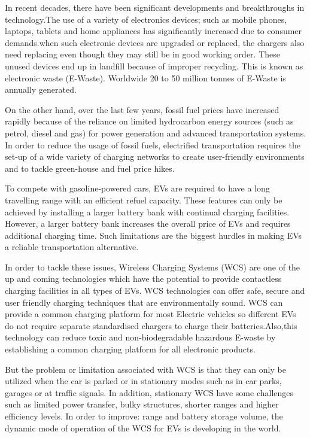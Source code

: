 In recent decades, there have been significant developments and breakthroughs in technology.The use of a variety of  electronics devices; such as mobile
phones, laptops, tablets and home appliances has significantly increased due to
consumer demands.when such electronic devices are upgraded or replaced, the
chargers also need replacing even though they may still be in good working order. 
These unused devices end up in landfill because of improper recycling. This
is known as electronic waste (E-Waste). Worldwide 20 to 50 million tonnes of
E-Waste is annually generated.

On the other hand, over the last few years, fossil fuel prices have increased rapidly because of the reliance
on limited hydrocarbon energy sources (such as petrol, diesel and gas) for power
generation and advanced transportation systems. In order to reduce the usage of fossil
fuels, electrified transportation requires the set-up of a wide variety of charging networks
to create user-friendly environments and to tackle green-house and fuel price hikes.

To compete with gasoline-powered cars, EVs are required to have a long travelling range with an efficient refuel
capacity. These features can only be achieved by installing a larger battery bank with
continual charging facilities. However, a larger battery bank increases the overall price
of EVs and requires additional charging time. Such limitations are the biggest hurdles in
making EVs a reliable transportation alternative.

In order to tackle these issues, Wireless Charging Systems (WCS) are one of the up and
coming technologies which have the potential to provide contactless charging facilities in all types of EVs.
WCS technologies  can offer safe, secure and user friendly charging
techniques that are environmentally sound. WCS can provide a common charging
platform for most Electric vehicles so different EVs do not require
separate standardised chargers to charge their batteries.Also,this technology can reduce toxic and non-biodegradable hazardous E-waste
by establishing a common charging platform for all electronic products.

But the problem or limitation associated with WCS is that they can only be utilized when the
car is parked or in stationary modes such as in car parks, garages or at traffic signals.
In addition, stationary WCS have some challenges such as
 limited power transfer, bulky structures, shorter ranges and higher
 efficiency levels. In order to improve: range and battery storage volume, the
 dynamic mode of operation of the WCS for EVs is developing in the world.





